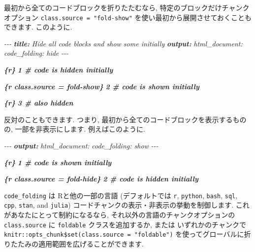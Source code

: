 \documentclass[
  11pt,
  lualatex,ja=standard,jafont=noto]{bxjsreport}
\newenvironment{Shaded}{\begin{snugshade}}{\end{snugshade}}
\newcommand{\AnnotationTok}[1]{\textcolor[rgb]{0.56,0.35,0.01}{\textbf{\textit{#1}}}}
\newcommand{\CommentTok}[1]{\textcolor[rgb]{0.56,0.35,0.01}{\textit{#1}}}
\newcommand{\InformationTok}[1]{\textcolor[rgb]{0.56,0.35,0.01}{\textbf{\textit{#1}}}}
\begin{document}
最初から全てのコードブロックを折りたたむなら, 特定のブロックだけチャンクオプション \texttt{class.source = "fold-show"} を使い最初から展開させておくこともできます. このように.

\begin{Shaded}
\begin{Highlighting}[]
\CommentTok{{-}{-}{-}}
\AnnotationTok{title:}\CommentTok{ Hide all code blocks and show some initially}
\AnnotationTok{output:}
\CommentTok{  html\_document:}
\CommentTok{    code\_folding: hide}
\CommentTok{{-}{-}{-}}

\InformationTok{\textasciigrave{}\textasciigrave{}\textasciigrave{}\{r\}}
\InformationTok{1  \# code is hidden initially}
\InformationTok{\textasciigrave{}\textasciigrave{}\textasciigrave{}}

\InformationTok{\textasciigrave{}\textasciigrave{}\textasciigrave{}\{r class.source = \textquotesingle{}fold{-}show\textquotesingle{}\}}
\InformationTok{2  \# code is shown initially}
\InformationTok{\textasciigrave{}\textasciigrave{}\textasciigrave{}}

\InformationTok{\textasciigrave{}\textasciigrave{}\textasciigrave{}\{r\}}
\InformationTok{3  \# also hidden}
\InformationTok{\textasciigrave{}\textasciigrave{}\textasciigrave{}}
\end{Highlighting}
\end{Shaded}

反対のこともできます. つまり, 最初から全てのコードブロックを表示するものの, 一部を非表示にします. 例えばこのように.

\begin{Shaded}
\begin{Highlighting}[]
\CommentTok{{-}{-}{-}}
\AnnotationTok{output:}
\CommentTok{  html\_document:}
\CommentTok{    code\_folding: show}
\CommentTok{{-}{-}{-}}

\InformationTok{\textasciigrave{}\textasciigrave{}\textasciigrave{}\{r\}}
\InformationTok{1  \# code is shown initially}
\InformationTok{\textasciigrave{}\textasciigrave{}\textasciigrave{}}

\InformationTok{\textasciigrave{}\textasciigrave{}\textasciigrave{}\{r class.source = \textquotesingle{}fold{-}hide\textquotesingle{}\}}
\InformationTok{2  \# code is hidden initially}
\InformationTok{\textasciigrave{}\textasciigrave{}\textasciigrave{}}
\end{Highlighting}
\end{Shaded}

\texttt{code\_folding} は Rと他の一部の言語 (デフォルトでは \texttt{r}, \texttt{python}, \texttt{bash}, \texttt{sql}, \texttt{cpp}, \texttt{stan}, and \texttt{julia}) コードチャンクの表示・非表示の挙動を制御します. これがあなたにとって制約になるなら, それ以外の言語のチャンクオプションの \texttt{class.source} に \texttt{foldable} クラスを追加するか, または いずれかのチャンクで \texttt{knitr::opts\_chunk\$set(class.source = "foldable")} を使ってグローバルに折りたたみの適用範囲を広げることができます.
\end{document}
